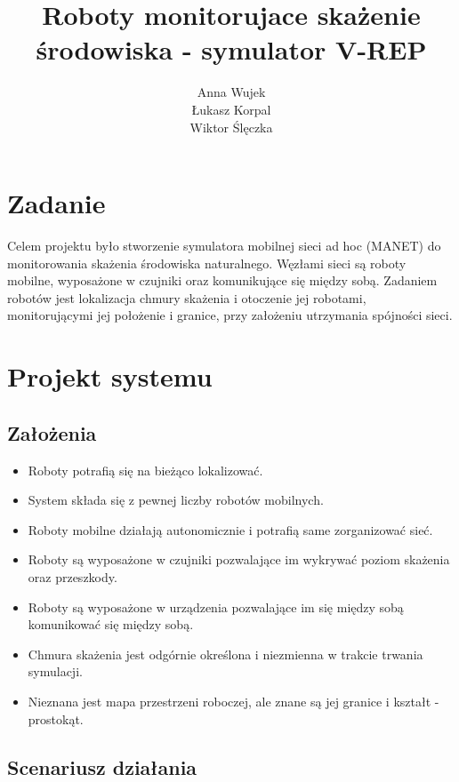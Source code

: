 \documentclass[a4paper, 12pt]{article}
\author{Anna Wujek \\ Łukasz Korpal \\ Wiktor Ślęczka}
\title{Roboty monitorujace skażenie środowiska - symulator V-REP}
\begin{document}
	\sloppy
	\maketitle
	\newpage
	\tableofcontents
	\newpage
	\section{Zadanie}
	Celem projektu było stworzenie symulatora mobilnej sieci ad hoc (MANET) do monitorowania skażenia środowiska naturalnego. Węzłami sieci są roboty mobilne, wyposażone w czujniki oraz komunikujące się między sobą. Zadaniem robotów jest lokalizacja chmury skażenia i otoczenie jej robotami, monitorującymi jej położenie i granice, przy założeniu utrzymania spójności sieci.
	
	
	\section{Projekt systemu}
	\subsection{Założenia}
	\begin{itemize}
		\item Roboty potrafią się na bieżąco lokalizować.
		\item System składa się z pewnej liczby robotów mobilnych.
		\item Roboty mobilne działają autonomicznie i potrafią same zorganizować sieć.
		\item Roboty są wyposażone w czujniki pozwalające im wykrywać poziom skażenia oraz przeszkody.
		\item Roboty są wyposażone w urządzenia pozwalające im się między sobą komunikować się między sobą.
		\item Chmura skażenia jest odgórnie określona i niezmienna w trakcie trwania symulacji.
		\item Nieznana jest mapa przestrzeni roboczej, ale znane są jej granice i kształt - prostokąt.
	\end{itemize}
	
	\subsection{Scenariusz działania}	
		
\end{document}
